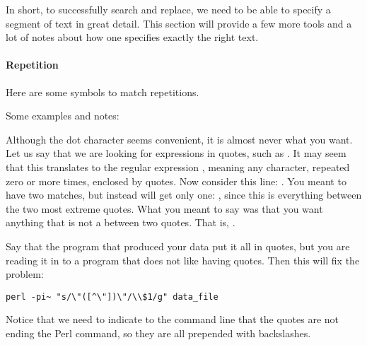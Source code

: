 In short, to successfully search and replace, we need to be able to
specify a segment of text in great detail. This section will provide a
few more tools and a lot of notes about how one specifies exactly the
right text.

\paragraph{Repetition} 
Here are some symbols to match repetitions.
\begin{center}
\end{center}

Some examples and notes:

Although the dot character seems convenient, it is almost never what you
want. Let us say that we are looking for expressions in quotes,
such as . It may seem that this translates to the regular
expression , meaning any character, repeated zero or more
times, enclosed by quotes. Now consider this line: . You meant to have two matches, but instead will get only
one: , since this is everything between the
two most extreme quotes. What you meant to say was that you want anything
that is not a  between two quotes. That is, . 

Say that the program that produced your data put it all in
quotes, but you are reading it in to a  program that does not like
having quotes. Then this will fix the problem:
\begin{lstlisting}
perl -pi~ "s/\"([^\"])\"/\\$1/g" data_file
\end{lstlisting}
Notice that we need to indicate to the command line that the quotes are
not ending the Perl command, so they are all prepended with backslashes.

